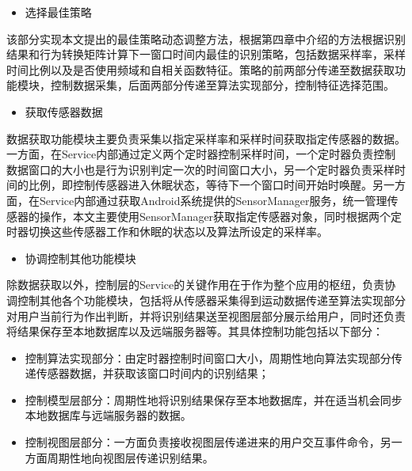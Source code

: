 \begin{itemize}
	\item 选择最佳策略
\end{itemize}
\par 该部分实现本文提出的最佳策略动态调整方法，根据第四章中介绍的方法根据识别结果和行为转换矩阵计算下一窗口时间内最佳的识别策略，包括数据采样率，采样时间比例以及是否使用频域和自相关函数特征。策略的前两部分传递至数据获取功能模块，控制数据采集，后面两部分传递至算法实现部分，控制特征选择范围。
\begin{itemize}
	\item 获取传感器数据
\end{itemize}
\par 数据获取功能模块主要负责采集以指定采样率和采样时间获取指定传感器的数据。一方面，在Service内部通过定义两个定时器控制采样时间，一个定时器负责控制数据窗口的大小也是行为识别判定一次的时间窗口大小，另一个定时器负责采样时间的比例，即控制传感器进入休眠状态，等待下一个窗口时间开始时唤醒。另一方面，在Service内部通过获取Android系统提供的SensorManager服务，统一管理传感器的操作，本文主要使用SensorManager获取指定传感器对象，同时根据两个定时器切换这些传感器工作和休眠的状态以及算法所设定的采样率。
\begin{itemize}
	\item 协调控制其他功能模块
\end{itemize}
\par 除数据获取以外，控制层的Service的关键作用在于作为整个应用的枢纽，负责协调控制其他各个功能模块，包括将从传感器采集得到运动数据传递至算法实现部分对用户当前行为作出判断，并将识别结果送至视图层部分展示给用户，同时还负责将结果保存至本地数据库以及远端服务器等。其具体控制功能包括以下部分：
\begin{itemize}
	\item 控制算法实现部分：由定时器控制时间窗口大小，周期性地向算法实现部分传递传感器数据，并获取该窗口时间内的识别结果；
	\item 控制模型层部分：周期性地将识别结果保存至本地数据库，并在适当机会同步本地数据库与远端服务器的数据。
	\item 控制视图层部分：一方面负责接收视图层传递进来的用户交互事件命令，另一方面周期性地向视图层传递识别结果。
\end{itemize}
